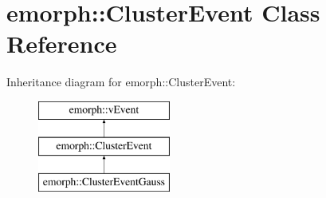 \hypertarget{classemorph_1_1ClusterEvent}{\section{emorph\-:\-:Cluster\-Event Class Reference}
\label{classemorph_1_1ClusterEvent}
}
Inheritance diagram for emorph\-:\-:Cluster\-Event\-:\begin{figure}[H]
\begin{center}
\leavevmode
\includegraphics[height=3.000000cm]{classemorph_1_1ClusterEvent}
\end{center}
\end{figure}
